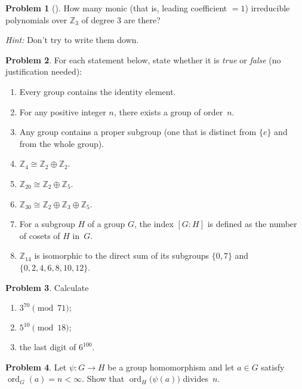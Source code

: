 \documentclass[10pt]{article}
\theoremstyle{definition} %
\newtheorem{problem}{Problem}
\theoremstyle{plain} %
\begin{document}
\begin{problem}[]
  How many monic (that is, leading coefficient $=1$) irreducible polynomials
  over $\mathbb{Z}_{3}$ of degree $3$ are there?

  \textit{Hint:} Don’t try to write them down.
\end{problem}
\begin{problem}
  For each statement below, state whether it is \emph{true} or \emph{false} (no justification needed):
  \begin{enumerate}[label=(\alph*)]
      \item Every group contains the identity element.
      \item For any positive integer $n$, there exists a group of order $n$.
      \item Any group contains a proper subgroup (one that is distinct from $\{e\}$ and from the whole group).
      \item $\mathbb{Z}_{4} \cong \mathbb{Z}_{2} \oplus \mathbb{Z}_{2}$.
      \item $\mathbb{Z}_{20} \cong \mathbb{Z}_{2} \oplus \mathbb{Z}_{5}$.
      \item $\mathbb{Z}_{30} \cong \mathbb{Z}_{2} \oplus \mathbb{Z}_{3} \oplus \mathbb{Z}_{5}$.
      \item For a subgroup $H$ of a group $G$, the index $[G:H]$ is defined as the number of cosets of $H$ in $G$.
      \item $\mathbb{Z}_{14}$ is isomorphic to the direct sum of its subgroups $\{0,7\}$ and $\{0,2,4,6,8,10,12\}$.
  \end{enumerate}
\end{problem}

\begin{problem}
  Calculate
  \begin{enumerate}[label=(\alph*)]
      \item $3^{70} \pmod{71};$
      \item $5^{10} \pmod{18};$
      \item the last digit of $6^{100}$.
  \end{enumerate}
\end{problem}

\begin{problem}
  Let $\psi : G \to H$ be a group homomorphism and let $a \in G$ satisfy $\operatorname{ord}_{G}(a)=n<\infty$.  
  Show that $\operatorname{ord}_{H}\!\bigl(\psi(a)\bigr)$ divides $n$.
\end{problem}
\end{document}
